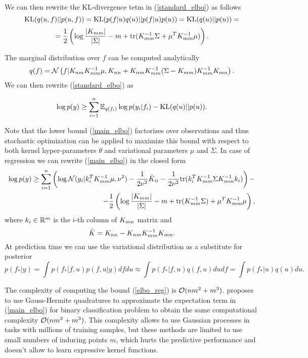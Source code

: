   We can then rewrite the KL-divergence tetm in (\ref{standard_elbo}) as follows
  \[
    \mbox{KL}(q(u, f) || p(u, f)) = \mbox{KL}(p(f | u) q(u) || p(f | u) p(u)) = \mbox{KL}(q(u) || p(u)) =
  \]
  \[
    = \frac 1 2 \left(\log \frac{|K_{mm}|}{|\Sigma|} - m + \mbox{tr}(K_{mm}^{-1} \Sigma + \mu^T K_{mm}^{-1} \mu) \right).
  \]

  The marginal distribution over $f$ can be computed analytically
  \[
    q(f) = \mathcal{N}\left(f | K_{nm} K_{mm}^{-1} \mu, K_{nn} + K_{nm} K_{mm}^{-1} (\Sigma - K_{mm}) K_{mm}^{-1} K_{mn}\right).
  \]
  We can then rewrite (\ref{standard_elbo}) as

  \begin{equation}
  \label{main_elbo}
    \log p(y) \ge \sum_{i=1}^n \mathbb{E}_{q(f_i)} \log p(y_i | f_i) - \mbox{KL}(q(u) || p(u)).
  \end{equation}

  Note that the lower bound (\ref{main_elbo}) factorizes over observations and
  thus stochastic optimization can be applied to maximize this bound with respect
  to both kernel hyper-parameters $\theta$ and variational parameters $\mu$ and
  $\Sigma$. In case of regression we can rewrite (\ref{main_elbo}) in the closed
  form
  \begin{equation}
    \label{elbo_reg}
    \begin{split}
      \log p(y) \ge
      \sum_{i=1}^n \left ( \log \mathcal{N} (y_i | k_{i}^T K_{mm}^{-1} \mu, \nu^2) -
        \frac 1 {2\nu^2} \tilde K_{ii} -
        \frac 1 {2\nu^2} \mbox{tr} (k_{i}^T K_{mm}^{-1} \Sigma K_{mm}^{-1} k_{i})
      \right )-
      \\
      - \frac 1 2 \left(
        \log \frac {|K_{mm}|} {|\Sigma|} - m + \mbox{tr}(K_{mm}^{-1} \Sigma) +
        \mu^T K_{mm}^{-1} \mu
      \right),
    \end{split}
  \end{equation}
  where $k_{i} \in \mathbb{R}^m$ is the $i$-th column of $K_{mn}$ matrix and
  \[
    \tilde{K} = K_{nn} - K_{nm} K_{mm}^{-1} K_{mn}.
  \]
  At prediction time we can use the variational distribution as a substitute for
  posterior
  \[
    p(f_* | y) = \int p(f_*| f, u) p(f, u |y) d f d u \approx
    \int p(f_* | f, u) q(f, u) d u d f = \int p(f_* | u) q(u) du.
  \]

  The complexity of computing the bound (\ref{elbo_reg}) is $\mathcal{O}(n m^2 + m^3)$.
  \citet{hensman2015} proposes to use Gauss-Hermite quadratures to approximate the
  expectation term in (\ref{main_elbo}) for binary classification problem to
  obtain the same computational complexity $\mathcal{O}(nm^2 + m^3)$. This complexity
  allows to use Gaussian processes in tasks with millions of training samples,
  but these methods are limited to use small numbers of inducing points $m$,
  which hurts the predictive performance and doesn't allow to learn expressive
  kernel functions.

